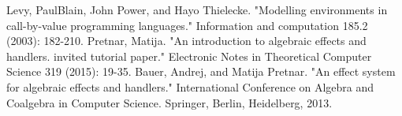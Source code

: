 \documentclass[12pt]{article}
\begin{document}
\begin{thebibliography}{9}
Levy, PaulBlain, John Power, and Hayo Thielecke. "Modelling environments in call-by-value programming languages." Information and computation 185.2 (2003): 182-210.
Pretnar, Matija. "An introduction to algebraic effects and handlers. invited tutorial paper." Electronic Notes in Theoretical Computer Science 319 (2015): 19-35.
Bauer, Andrej, and Matija Pretnar. "An effect system for algebraic effects and handlers." International Conference on Algebra and Coalgebra in Computer Science. Springer, Berlin, Heidelberg, 2013.
\end{thebibliography}
\end{document}
